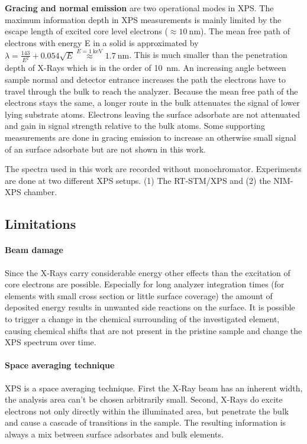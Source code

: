 \textbf{Gracing and normal emission} are two operational modes in XPS. The maximum information depth in XPS measurements is mainly limited by the escape length of excited core level electrons ($\approx \SI{10}{\nano \meter}$). The mean free path of electrons with energy E in a solid is approximated by $\lambda = \frac{143}{E^2} + 0.054 \sqrt{E} \stackrel{E=\SI{1}{\kilo \eV}}{\approx} \SI{1.7}{\nano \meter}$.\cite{Seah_Quantitative_1979} This is much smaller than the penetration depth of X-Rays which is in the order of \SI{10}{\nano \meter}. An increasing angle between sample normal and detector entrance increases the path the electrons have to travel through the bulk to reach the analyzer. Because the mean free path of the electrons stays the same, a longer route in the bulk attenuates the signal of lower lying substrate atoms. Electrons leaving the surface adsorbate are not attenuated and gain in signal strength relative to the bulk atoms. Some supporting measurements are done in gracing emission to increase an otherwise small signal of an surface adsorbate but are not shown in this work.

The spectra used in this work are recorded without monochromator. Experiments are done at two different XPS setups. (1) The RT-STM/XPS and (2) the NIM-XPS chamber.  

\subsection{Limitations}
\paragraph{Beam damage}
Since the X-Rays carry considerable energy other effects than the excitation of core electrons are possible. Especially for long analyzer integration times (for elements with small cross section or little surface coverage) the amount of deposited energy results in unwanted side reactions on the surface. It is possible to trigger a change in the chemical surrounding of the investigated element, causing chemical shifts that are not present in the pristine sample and change the XPS spectrum over time.

\paragraph{Space averaging technique}
XPS is a space averaging technique. First the X-Ray beam has an inherent width, the analysis area can't be chosen arbitrarily small. Second, X-Rays do excite electrons not only directly within the illuminated area, but penetrate the bulk and cause a cascade of transitions in the sample. The resulting information is always a mix between surface adsorbates and bulk elements.